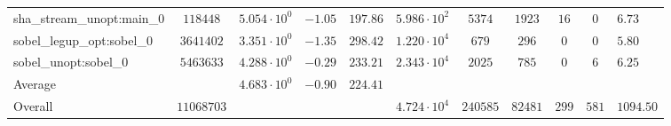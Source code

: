 \begin{tabular}{|l|c|HHc|c|c|c|c|cH|}
sha\_stream\_unopt:main\_0                      & $ 118448   $ & $ 5.054 \cdot 10^{0} $ & $ -1.05 $ & $ 197.86 $ & $ 5.986 \cdot 10^{2}  $ & $ 5374   $ & $ 1923  $ & $ 16  $ & $ 0   $ & $ 6.73    $ \\
sobel\_legup\_opt:sobel\_0                      & $ 3641402  $ & $ 3.351 \cdot 10^{0} $ & $ -1.35 $ & $ 298.42 $ & $ 1.220 \cdot 10^{4}  $ & $ 679    $ & $ 296   $ & $ 0   $ & $ 0   $ & $ 5.80    $ \\
sobel\_unopt:sobel\_0                           & $ 5463633  $ & $ 4.288 \cdot 10^{0} $ & $ -0.29 $ & $ 233.21 $ & $ 2.343 \cdot 10^{4}  $ & $ 2025   $ & $ 785   $ & $ 0   $ & $ 6   $ & $ 6.25    $ \\
\hline
Average                                         & $          $ & $ 4.683 \cdot 10^{0} $ & $ -0.90 $ & $ 224.41 $ & $                     $ & $        $ & $       $ & $     $ & $     $ & $         $ \\
\hline
Overall                                         & $ 11068703 $ & $                    $ & $       $ & $        $ & $ 4.724 \cdot 10^{4}  $ & $ 240585 $ & $ 82481 $ & $ 299 $ & $ 581 $ & $ 1094.50 $ \\
\hline
\end{tabular}
